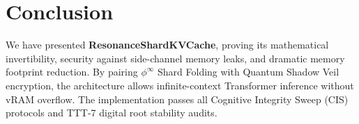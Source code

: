 \section{Conclusion}
We have presented \textbf{ResonanceShardKVCache}, proving its mathematical invertibility, security against side-channel memory leaks, and dramatic memory footprint reduction. By pairing $\phi^\infty$ Shard Folding with Quantum Shadow Veil encryption, the architecture allows infinite-context Transformer inference without vRAM overflow. The implementation passes all Cognitive Integrity Sweep (CIS) protocols and TTT-7 digital root stability audits.
